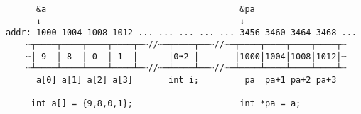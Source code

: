 \documentclass[varwidth=20cm,crop]{standalone}
\begin{document}
\begin{verbatim}
      &a                                      &pa
      ↓                                       ↓
addr: 1000 1004 1008 1012 ... ... ... ... ... 3456 3460 3464 3468 ...
    ┈┬────┬────┬────┬────┬─┈//┈─┬────┬──┈//┈─┬────┬────┬────┬────┬┈
    ┈│ 9  │ 8  │ 0  │ 1  │      │0➠2 │       │1000│1004│1008│1012│┈
    ┈┴────┴────┴────┴────┴─┈//┈─┴────┴──┈//┈─┴────┴────┴────┴────┴┈
      a[0] a[1] a[2] a[3]       int i;         pa  pa+1 pa+2 pa+3

     int a[] = {9,8,0,1};                     int *pa = a;
\end{verbatim}
\end{document}
